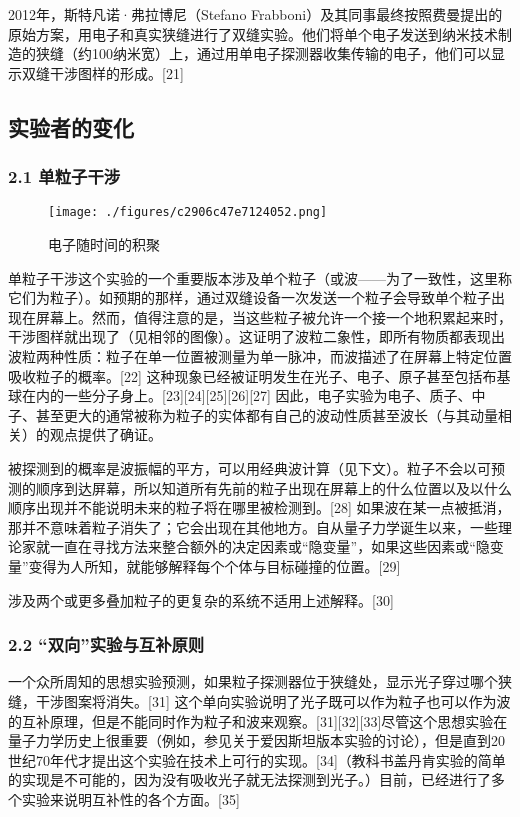 2012年，斯特凡诺·弗拉博尼（Stefano Frabboni）及其同事最终按照费曼提出的原始方案，用电子和真实狭缝进行了双缝实验。他们将单个电子发送到纳米技术制造的狭缝（约100纳米宽）上，通过用单电子探测器收集传输的电子，他们可以显示双缝干涉图样的形成。[21]

\subsection{实验者的变化}
\subsubsection{2.1 单粒子干涉}
\begin{figure}[ht]
\centering
\texttt{[image: ./figures/c2906c47e7124052.png]}
\caption{电子随时间的积聚} \label{fig_SFSY_3}
\end{figure}
单粒子干涉这个实验的一个重要版本涉及单个粒子（或波——为了一致性，这里称它们为粒子）。如预期的那样，通过双缝设备一次发送一个粒子会导致单个粒子出现在屏幕上。然而，值得注意的是，当这些粒子被允许一个接一个地积累起来时，干涉图样就出现了（见相邻的图像）。这证明了波粒二象性，即所有物质都表现出波粒两种性质：粒子在单一位置被测量为单一脉冲，而波描述了在屏幕上特定位置吸收粒子的概率。[22] 这种现象已经被证明发生在光子、电子、原子甚至包括布基球在内的一些分子身上。[23][24][25][26][27] 因此，电子实验为电子、质子、中子、甚至更大的通常被称为粒子的实体都有自己的波动性质甚至波长（与其动量相关）的观点提供了确证。

被探测到的概率是波振幅的平方，可以用经典波计算（见下文）。粒子不会以可预测的顺序到达屏幕，所以知道所有先前的粒子出现在屏幕上的什么位置以及以什么顺序出现并不能说明未来的粒子将在哪里被检测到。[28] 如果波在某一点被抵消，那并不意味着粒子消失了；它会出现在其他地方。自从量子力学诞生以来，一些理论家就一直在寻找方法来整合额外的决定因素或“隐变量”，如果这些因素或“隐变量”变得为人所知，就能够解释每个个体与目标碰撞的位置。[29]

涉及两个或更多叠加粒子的更复杂的系统不适用上述解释。[30]

\subsubsection{2.2 “双向”实验与互补原则}
一个众所周知的思想实验预测，如果粒子探测器位于狭缝处，显示光子穿过哪个狭缝，干涉图案将消失。[31] 这个单向实验说明了光子既可以作为粒子也可以作为波的互补原理，但是不能同时作为粒子和波来观察。[31][32][33]尽管这个思想实验在量子力学历史上很重要（例如，参见关于爱因斯坦版本实验的讨论），但是直到20世纪70年代才提出这个实验在技术上可行的实现。[34]（教科书盖丹肯实验的简单的实现是不可能的，因为没有吸收光子就无法探测到光子。）目前，已经进行了多个实验来说明互补性的各个方面。[35]

